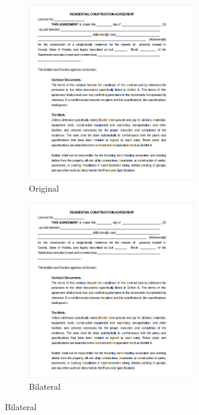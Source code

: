 \documentclass[12pt]{article}
\begin{document}
	\begin{figure}
		\centering
		\begin{subfigure}{0.4\textwidth}
			\centering
			\includegraphics[width=0.8\textwidth]{document/document.jpg}
			\caption{Original}
		\end{subfigure}
		\begin{subfigure}{0.4\textwidth}
			\centering
			\includegraphics[width=0.8\textwidth]{document/documentjpgBilateralFilter.png}
			\caption{Bilateral}
		\end{subfigure}
		

\end{figure}
\end{document}
